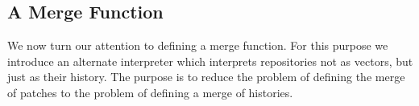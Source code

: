 \subsection{A Merge Function}

We now turn our attention to defining a merge function.
For this purpose we introduce an alternate interpreter which interprets repositories
not as vectors, but just as their history.
The purpose is to reduce the problem of defining the merge of patches to the problem
of defining a merge of histories.
\begin{code}%
\>[0]\AgdaSpace{}%
\AgdaSymbol{:}\AgdaSpace{}%
\AgdaSpace{}%
\AgdaSpace{}%
\<%
\\
\>[0]\AgdaSpace{}%
\AgdaSymbol{(}\AgdaSpace{}%
\AgdaSymbol{)}\AgdaSpace{}%
\AgdaSymbol{=}\AgdaSpace{}%
\AgdaSpace{}%
\<%
\\
\>[0]\AgdaSpace{}%
\AgdaSymbol{(}\AgdaSpace{}%
\AgdaSpace{}%
\AgdaSpace{}%
\AgdaSpace{}%
\AgdaSymbol{)}\AgdaSpace{}%
\AgdaSymbol{=}\AgdaSpace{}%
\AgdaSpace{}%
\AgdaSymbol{(}\AgdaSpace{}%
\AgdaSymbol{\{}\AgdaSpace{}%
\AgdaSymbol{=}\AgdaSpace{}%
\AgdaSymbol{\}}\AgdaSpace{}%
\AgdaSymbol{(}\AgdaSpace{}%
\AgdaSymbol{(}\AgdaSpace{}%
\AgdaSpace{}%
\AgdaSpace{}%
\AgdaSpace{}%
\AgdaOperator{\AgdaInductiveConstructor{::\AgdaUnderscore{}}}\AgdaSymbol{)))}\AgdaSpace{}%
\<%
\\
\>[0]\AgdaSpace{}%
\AgdaSymbol{(}\AgdaSpace{}%
\AgdaSpace{}%
\AgdaSpace{}%
\AgdaSymbol{)}\AgdaSpace{}%
\AgdaSymbol{=}\AgdaSpace{}%
\AgdaSpace{}%
\AgdaSymbol{(}\AgdaSpace{}%
\AgdaSymbol{\{}\AgdaSpace{}%
\AgdaSymbol{=}\AgdaSpace{}%
\AgdaSymbol{\}}\AgdaSpace{}%
\AgdaSymbol{(}\AgdaSpace{}%
\AgdaSymbol{(}\AgdaSpace{}%
\AgdaSpace{}%
\AgdaOperator{\AgdaInductiveConstructor{::\AgdaUnderscore{}}}\AgdaSymbol{)))}\AgdaSpace{}%
\<%
\\

\end{code}

